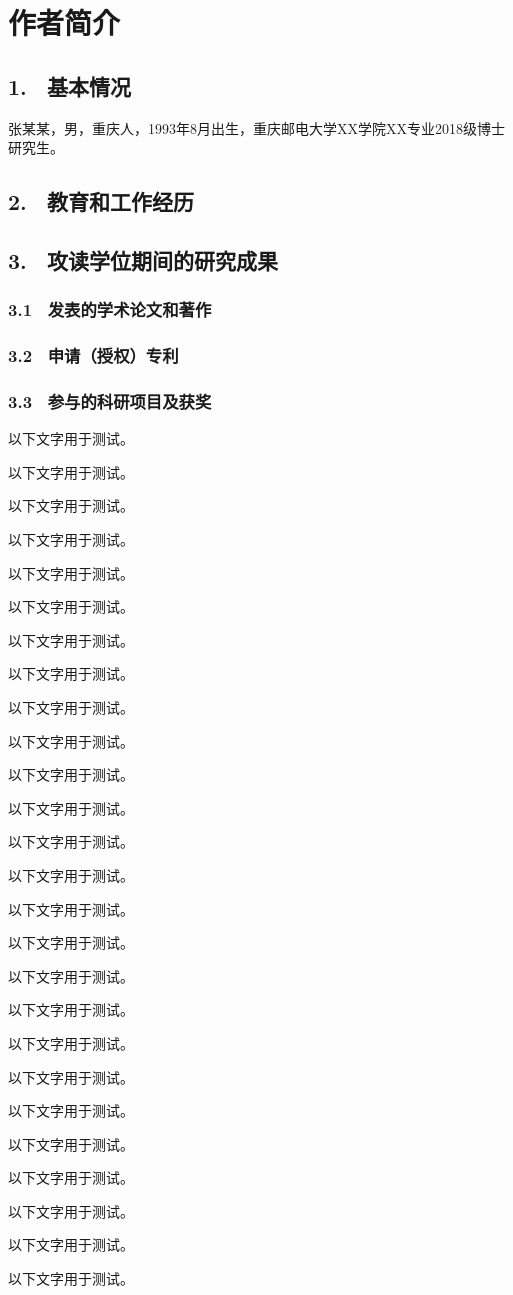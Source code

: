 \specialsectioning


\chapter{作者简介}
\thispagestyle{others}
\pagestyle{others}
\xiaosi

\section{1. \ 基本情况}
张某某，男，重庆人，1993年8月出生，重庆邮电大学XX学院XX专业2018级博士研究生。

\section{2. \ 教育和工作经历}

\section{3. \ 攻读学位期间的研究成果}

\vspace{0.2cm}

\subsection{3.1 \ 发表的学术论文和著作}


\subsection{3.2 \ 申请（授权）专利}

\subsection{3.3 \ 参与的科研项目及获奖}

以下文字用于测试。

以下文字用于测试。

以下文字用于测试。

以下文字用于测试。

以下文字用于测试。

以下文字用于测试。

以下文字用于测试。

以下文字用于测试。

以下文字用于测试。

以下文字用于测试。

以下文字用于测试。

以下文字用于测试。

以下文字用于测试。

以下文字用于测试。

以下文字用于测试。

以下文字用于测试。

以下文字用于测试。

以下文字用于测试。

以下文字用于测试。

以下文字用于测试。

以下文字用于测试。

以下文字用于测试。

以下文字用于测试。

以下文字用于测试。

以下文字用于测试。

以下文字用于测试。



